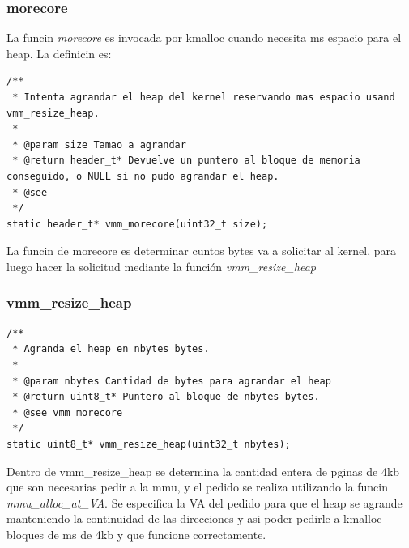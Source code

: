 \subsubsection{morecore}
La funcin \textit{morecore} es invocada por kmalloc cuando necesita ms espacio para el heap. La definicin es:
\begin{verbatim}
/**
 * Intenta agrandar el heap del kernel reservando mas espacio usand vmm_resize_heap.
 * 
 * @param size Tamao a agrandar
 * @return header_t* Devuelve un puntero al bloque de memoria conseguido, o NULL si no pudo agrandar el heap.
 * @see 
 */
static header_t* vmm_morecore(uint32_t size);
\end{verbatim}
La funcin de morecore es determinar cuntos bytes va a solicitar al kernel, para luego hacer la solicitud mediante la función \textit{vmm\_resize\_heap}

\subsubsection{vmm\_resize\_heap}
\begin{verbatim}
/**
 * Agranda el heap en nbytes bytes.
 *
 * @param nbytes Cantidad de bytes para agrandar el heap
 * @return uint8_t* Puntero al bloque de nbytes bytes.
 * @see vmm_morecore
 */
static uint8_t* vmm_resize_heap(uint32_t nbytes);
\end{verbatim}
Dentro de vmm\_resize\_heap se determina la cantidad entera de pginas de 4kb que son necesarias pedir a la mmu, y el pedido se realiza utilizando la funcin \textit{mmu\_alloc\_at\_VA}. Se especifica la VA del pedido para que el heap se agrande manteniendo la continuidad de las direcciones y asi poder pedirle a kmalloc bloques de ms de 4kb y que funcione correctamente.